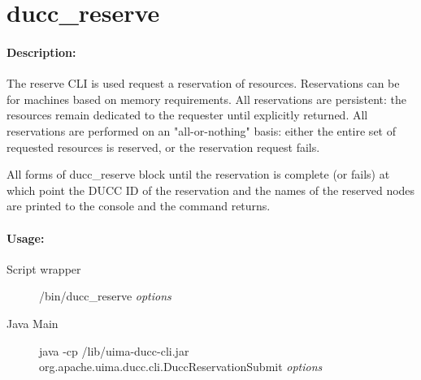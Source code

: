 % 
% 
% 
% 
\ifpdf
\else
{}
\fi
    \section{ducc\_reserve}

    \paragraph{Description:}
    The reserve CLI is used request a reservation of resources. Reservations can be for machines 
    based on memory requirements. All reservations are persistent: 
    the resources remain dedicated to the requester until explicitly returned. All reservations are 
    performed on an "all-or-nothing" basis: either the entire set of requested resources is reserved, 
    or the reservation request fails. 

    All forms of ducc\_reserve block until the reservation is complete (or fails) at which point the DUCC
    ID of the reservation and the names of the reserved nodes are printed to the console and the
    command returns.

    \paragraph{Usage:}
        \begin{description}
        \item[Script wrapper] \ducchome/bin/ducc\_reserve {\em options}
        \item[Java Main]      java -cp \ducchome/lib/uima-ducc-cli.jar org.apache.uima.ducc.cli.DuccReservationSubmit {\em options}
        \end{description}


